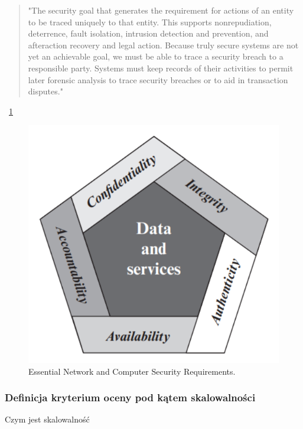 \documentclass[runningheads,12pt]{llncs}
\begin{document}
\begin{enumerate}
    \begin{quote}
        "The security goal that generates the requirement for actions of an entity to be traced uniquely to that entity. This supports nonrepudiation, deterrence, fault isolation, intrusion detection and prevention, and afteraction recovery and legal action. Because truly secure systems are not yet an achievable goal, we must be able to trace a security breach to a responsible party. Systems must keep records of their activities to permit later forensic analysis to trace security breaches or to aid in transaction disputes." ~\cite[p. 23]{stallings2017cryptography}
    \end{quote}
\end{enumerate}


~\ref{fig1}

\begin{figure}
    \includegraphics[width=\linewidth]{images/image-security.png}
    \caption{Essential Network and Computer Security Requirements.} \label{fig1}
\end{figure}

\subsubsection{Definicja kryterium oceny pod kątem skalowalności}

Czym jest skalowalność 
\end{document}
